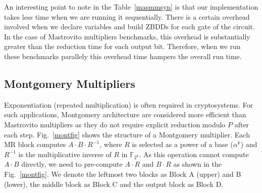 \par An interesting point to note in the Table~\ref{masmmsyn} is that our implementation takes less time when we are running it sequentially. There is a certain overhead involved when we declare variables and build ZBDDs for each gate of the circuit. In the case of Mastrovito multipliers benchmarks, this overhead is substantially greater than the reduction time for each output bit. Therefore, when we run these benchmarks parallely this overhead time hampers the overall run time. 
 

\subsection{Montgomery Multipliers}
Exponentiation (repeated multiplication) is often required in cryptosystems.  
For such applications, Montgomery architecture \cite{acar:1998} \cite{wu:2002}
\cite{Knezevic:2008} are considered more efficient than Mastrovito multipliers
as they do not require explicit reduction modulo $P$ after each step.
Fig.~\ref{montfig} shows the structure of a Montgomery
multiplier. Each MR block computes $A\cdot B\cdot R^{-1}$, where $R$
is selected as a power of a base ($\alpha^{k}$) and $R^{-1}$ is the multiplicative 
inverse of $R$ in $\mathbb{F}_{2^k}$. As this operation cannot compute $A\cdot B$
directly, we need to pre-compute $A\cdot R$ and $B\cdot R$ as shown in the Fig.~\ref{montfig}. 
We denote the leftmost
two blocks as Block A (upper) and B (lower), the middle block as Block
C and the output block as Block D.

